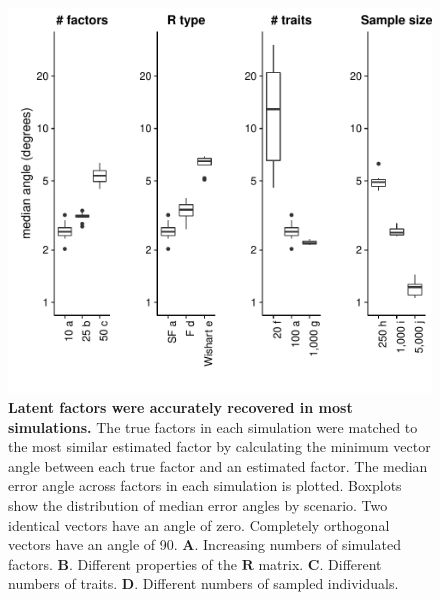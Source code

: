 \documentclass[12pt,titlepage]{article}
\begin{document}
\begin{figure}[b]
\begin{center}
\includegraphics[width=5in]{Figures/factor_angles.pdf}
\caption[Error in latent factor trait loadings by scenario]{ \textbf{Latent factors were accurately recovered in most simulations.} The true factors in each simulation were matched to the most similar estimated factor by calculating the minimum vector angle between each true factor and an estimated factor. The median error angle across factors in each simulation is plotted. Boxplots show the distribution of median error angles by scenario. Two identical vectors have an angle of zero. Completely orthogonal vectors have an angle of 90. \textbf{A}. Increasing numbers of simulated factors. \textbf{B}. Different properties of the $\mathbf{R}$ matrix. \textbf{C}. Different numbers of traits. \textbf{D}. Different numbers of sampled individuals.}
\label{fig:factor_angles}
\end{center}
\end{figure}
\end{document}
